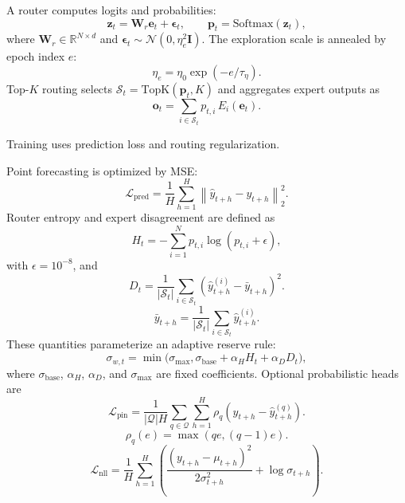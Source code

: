 ﻿\documentclass[review,1p,times]{elsarticle}
\begin{document}
A router computes logits and probabilities:
\begin{equation}
\mathbf{z}_t = \mathbf{W}_r\mathbf{e}_t + \boldsymbol{\epsilon}_t,\qquad
\mathbf{p}_t = \mathrm{Softmax}(\mathbf{z}_t),
\label{eq:router_softmax}
\end{equation}
where $\mathbf{W}_r\in\mathbb{R}^{N\times d}$ and $\boldsymbol{\epsilon}_t\sim\mathcal{N}(0,\eta_e^2\mathbf{I})$. The exploration scale is annealed by epoch index $e$:
\begin{equation}
\eta_e=\eta_0\exp(-e/\tau_{\eta}).
\label{eq:router_anneal}
\end{equation}
Top-$K$ routing selects $\mathcal{S}_t=\mathrm{TopK}(\mathbf{p}_t,K)$ and aggregates expert outputs as
\begin{equation}
\mathbf{o}_t = \sum_{i\in\mathcal{S}_t} p_{t,i}\,E_i(\mathbf{e}_t).
\label{eq:moe_topk}
\end{equation}


\label{subsec:method_edge_train}
Training uses prediction loss and routing regularization.

Point forecasting is optimized by MSE:
\begin{equation}
\mathcal{L}_{\text{pred}} = \frac{1}{H}\sum_{h=1}^{H}\left\|\hat{y}_{t+h}-y_{t+h}\right\|_2^2.
\label{eq:loss_pred}
\end{equation}
Router entropy and expert disagreement are defined as
\begin{equation}
H_t = -\sum_{i=1}^{N} p_{t,i} \log(p_{t,i} + \epsilon),
\end{equation}
with $\epsilon=10^{-8}$, and
\begin{equation}
D_t = \frac{1}{|\mathcal{S}_t|} \sum_{i \in \mathcal{S}_t} \left(\hat{y}^{(i)}_{t+h} - \bar{y}_{t+h}\right)^2.
\end{equation}
\begin{equation}
\bar{y}_{t+h} = \frac{1}{|\mathcal{S}_t|} \sum_{i \in \mathcal{S}_t} \hat{y}^{(i)}_{t+h}.
\end{equation}
These quantities parameterize an adaptive reserve rule:
\begin{equation}
\sigma_{w,t} = \min\Big(\sigma_{\max}, \sigma_{\mathrm{base}} + \alpha_H H_t + \alpha_D D_t\Big),
\end{equation}
where $\sigma_{\mathrm{base}}$, $\alpha_H$, $\alpha_D$, and $\sigma_{\max}$ are fixed coefficients. Optional probabilistic heads are
\begin{equation}
\mathcal{L}_{\text{pin}}=\frac{1}{|\mathcal{Q}|H}\sum_{q\in\mathcal{Q}}\sum_{h=1}^{H}\rho_q\!\left(y_{t+h}-\hat{y}^{(q)}_{t+h}\right).
\end{equation}
\begin{equation}
\rho_q(e)=\max(qe,(q-1)e).
\end{equation}
\begin{equation}
\mathcal{L}_{\text{nll}}=\frac{1}{H}\sum_{h=1}^{H}\left(\frac{(y_{t+h}-\mu_{t+h})^2}{2\sigma_{t+h}^2}+\log\sigma_{t+h}\right).
\end{equation}
\end{document}
